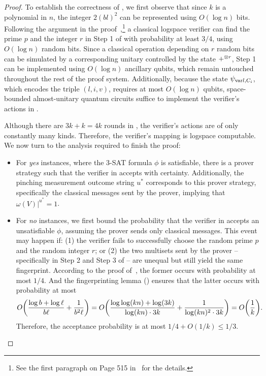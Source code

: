 \documentclass[11pt, a4paper]{article}
\numberwithin{equation}{section}
\numberwithin{figure}{section}
\newcommand{\threeSAT}{\textnormal{\textsc{3-SAT}}\xspace}
\DeclarePairedDelimiter\rbra{\lparen}{\rparen}
\let\ket\relax\DeclarePairedDelimiter\ket{\lvert}{\rangle}
\newcommand{\var}{\mathrm{var}}
\begin{document}
\begin{proof}
    \vspace{1em}
    To establish the correctness of , 
    we first observe that since $k$ is a polynomial in $n$, the integer $2(bl)^2$ can be represented using $O(\log n)$ bits. 
    Following the argument in the proof~\cite[Lemma 2]{CL95},\footnote{See the first paragraph on Page 515 in~\cite{CL95} for the details.} a classical logspace verifier can find the prime $p$ and the integer $r$ in Step 1 of  with probability at least $3/4$, using $O(\log n)$ random bits. 
    Since a classical operation depending on $r$ random bits can be simulated by a corresponding unitary controlled by the state $\ket{+}^{\otimes r}$, Step 1 can be implemented using $O(\log{n})$ ancillary qubits, which remain untouched throughout the rest of the proof system. Additionally, because the state $\ket{\psi_{\var{l},C_i}}$, which encodes the triple $(l,i,v)$, requires at most $O(\log n)$ qubits, space-bounded almost-unitary quantum circuits suffice to implement the verifier's actions in .
    
    Although there are $3k+k=4k$ rounds in , the verifier's actions are of only constantly many kinds. Therefore, the verifier's mapping is logspace computable. We now turn to the analysis required to finish the proof:
    \begin{itemize}
        \item For \textit{yes} instances, where the \threeSAT{} formula $\phi$ is satisfiable, there is a prover strategy such that the verifier in  accepts with certainty. Additionally, the pinching measurement outcome string $u^*$ corresponds to this prover strategy, specifically the classical messages sent by the prover, implying that $\omega(V)|^{u^*} = 1$. 
        \item For \textit{no} instances, we first bound the probability that the verifier in  accepts an unsatisfiable $\phi$, assuming the prover sends only classical messages. This event may happen if: (1) the verifier fails to successfully choose the random prime $p$ and the random integer $r$; or (2) the two multisets sent by the prover -- specifically in Step 2 and Step 3 of  -- are unequal but still yield the same fingerprint. According to the proof of~\cite[Lemma 2]{CL95}, the former occurs with probability at most $1/4$. And the fingerprinting lemma () ensures that the latter occurs with probability at most 
        \[O\rbra*{ \frac{\log b + \log \ell}{b\ell}+ \frac{1}{b^2\ell} } = O\rbra*{ \frac{\log\log(kn) + \log(3k)}{\log(kn) \cdot 3k} + \frac{1}{\log(kn)^2 \cdot 3k}} = O\rbra*{\frac{1}{k}}.\]
        Therefore, the acceptance probability is at most $1/4 + O(1/k) \leq 1/3$. 


\end{itemize}
\end{proof}
\end{document}
